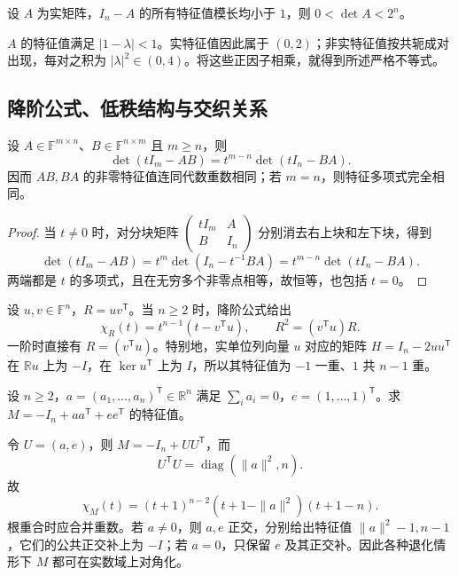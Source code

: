 \begin{example}
设 $A$ 为实矩阵，$I_n-A$ 的所有特征值模长均小于 $1$，则 $0<\det A<2^n$。
\end{example}
\begin{solve}
$A$ 的特征值满足 $|1-\lambda|<1$。实特征值因此属于 $(0,2)$；非实特征值按共轭成对出现，每对之积为 $|\lambda|^2\in(0,4)$。将这些正因子相乘，就得到所述严格不等式。
\end{solve}

\subsection{降阶公式、低秩结构与交织关系}

\begin{theorem}
\label{thm:xie-ex-eig-ab-ba}
设 $A\in\mathbb F^{m\times n}$、$B\in\mathbb F^{n\times m}$ 且 $m\ge n$，则
\begin{equation}
\det(tI_m-AB)=t^{m-n}\det(tI_n-BA).
\label{eq:xie-ex-eig-ab-ba-characteristic}
\end{equation}
因而 $AB,BA$ 的非零特征值连同代数重数相同；若 $m=n$，则特征多项式完全相同。
\end{theorem}
\begin{proof}
当 $t\ne0$ 时，对分块矩阵 $\begin{pmatrix}tI_m&A\\B&I_n\end{pmatrix}$ 分别消去右上块和左下块，得到
\[
\det(tI_m-AB)=t^m\det(I_n-t^{-1}BA)
=t^{m-n}\det(tI_n-BA).
\]
两端都是 $t$ 的多项式，且在无穷多个非零点相等，故恒等，也包括 $t=0$。
\end{proof}

\begin{example}
\label{ex:xie-ex-eig-rank-one-spectrum}
设 $u,v\in\mathbb F^n$，$R=uv^{\mathsf T}$。当 $n\ge2$ 时，降阶公式给出
\[
\chi_R(t)=t^{n-1}(t-v^{\mathsf T}u),\qquad
R^2=(v^{\mathsf T}u)R.
\]
一阶时直接有 $R=(v^{\mathsf T}u)$。特别地，实单位列向量 $u$ 对应的矩阵 $H=I_n-2uu^{\mathsf T}$ 在 $\mathbb Ru$ 上为 $-I$，在 $\ker u^{\mathsf T}$ 上为 $I$，所以其特征值为 $-1$ 一重、$1$ 共 $n-1$ 重。
\end{example}

\begin{example}
设 $n\ge2$，$a=(a_1,\ldots,a_n)^{\mathsf T}\in\mathbb R^n$ 满足 $\sum_i a_i=0$，$e=(1,\ldots,1)^{\mathsf T}$。求 $M=-I_n+aa^{\mathsf T}+ee^{\mathsf T}$ 的特征值。
\end{example}
\begin{solve}
令 $U=(a,e)$，则 $M=-I_n+UU^{\mathsf T}$，而
\[
U^{\mathsf T}U=\operatorname{diag}(\|a\|^2,n).
\]
故
\[
\chi_M(t)=(t+1)^{n-2}(t+1-\|a\|^2)(t+1-n).
\]
根重合时应合并重数。若 $a\ne0$，则 $a,e$ 正交，分别给出特征值 $\|a\|^2-1,n-1$，它们的公共正交补上为 $-I$；若 $a=0$，只保留 $e$ 及其正交补。因此各种退化情形下 $M$ 都可在实数域上对角化。
\end{solve}

